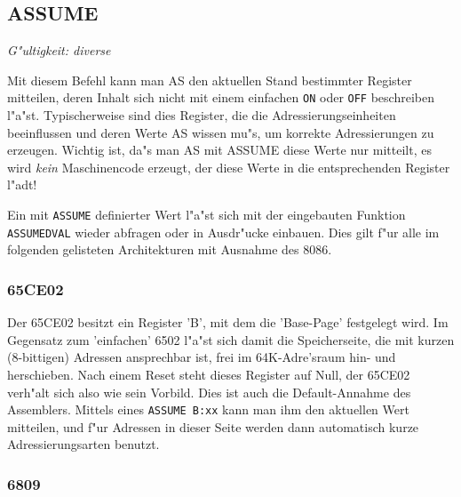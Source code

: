 \documentclass[12pt,a4paper,twoside]{report}
\makeatletter
\newcommand{\tty}[1]{{\tt #1}}
\newcommand{\ttindex}[1]{\index{#1@{\tt #1}}}
\newcommand{\asname}{AS}
\makeatother
\begin{document}

\subsection{ASSUME}
\ttindex{ASSUME}


{\em G"ultigkeit: diverse}

Mit diesem Befehl kann man \asname{} den aktuellen Stand bestimmter Register
mitteilen, deren Inhalt sich nicht mit einem einfachen \tty{ON} oder
\tty{OFF} beschreiben l"a"st.  Typischerweise sind dies Register, die die
Adressierungseinheiten beeinflussen und deren Werte \asname{} wissen mu"s, um
korrekte Adressierungen zu erzeugen.  Wichtig ist, da"s man \asname{} mit ASSUME
diese Werte nur mitteilt, es wird {\em kein} Maschinencode erzeugt, der
diese Werte in die entsprechenden Register l"adt!

Ein mit \tty{ASSUME} definierter Wert l"a"st sich mit der
eingebauten Funktion \tty{ASSUMEDVAL} wieder abfragen oder in
Ausdr"ucke einbauen.  Dies gilt f"ur alle im folgenden gelisteten
Architekturen mit Ausnahme des 8086.


\subsubsection{65CE02}

Der 65CE02 besitzt ein Register 'B', mit dem die 'Base-Page' festgelegt wird.
Im Gegensatz zum 'einfachen' 6502 l"a"st sich damit die Speicherseite, die
mit kurzen (8-bittigen) Adressen ansprechbar ist, frei im 64K-Adre'sraum hin-
und herschieben.  Nach einem Reset steht dieses Register auf Null, der 65CE02
verh"alt sich also wie sein Vorbild.  Dies ist auch die Default-Annahme des
Assemblers.  Mittels eines \tty{ASSUME B:xx} kann man ihm den aktuellen Wert
mitteilen, und f"ur Adressen in dieser Seite werden dann automatisch kurze
Adressierungsarten benutzt.


\subsubsection{6809}
\end{document}
